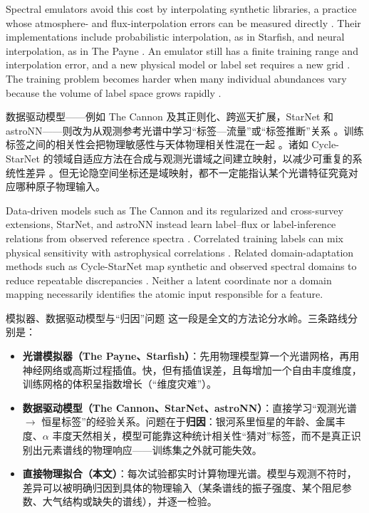 \begin{EN}
Spectral emulators avoid this cost by interpolating synthetic libraries, a
practice whose atmosphere- and flux-interpolation errors can be measured
directly \citep{MeszarosAllendePrieto2013}. Their
implementations include probabilistic interpolation, as in Starfish, and
neural interpolation, as in The Payne \citep{Czekala2015,Ting2019}. An emulator still
has a finite training range and interpolation error, and a new physical model
or label set requires a new grid \citep{Rozanski2025a}. The training problem
becomes harder when many individual abundances vary because the volume of label
space grows rapidly \citep{Casey2016,Ting2016}.
\end{EN}

数据驱动模型——例如 The Cannon 及其正则化、跨巡天扩展，StarNet 和 astroNN——则改为从观测参考光谱中学习“标签—流量”或“标签推断”关系 \citep{Ness2015,Casey2016,Ho2017,Fabbro2018,LeungBovy2019}。训练标签之间的相关性会把物理敏感性与天体物理相关性混在一起 \citep{Ting2017LAMOST,Xiang2019}。诸如 Cycle-StarNet 的领域自适应方法在合成与观测光谱域之间建立映射，以减少可重复的系统性差异 \citep{OBriain2021}。但无论隐空间坐标还是域映射，都不一定能指认某个光谱特征究竟对应哪种原子物理输入。

\begin{EN}
Data-driven models such as The Cannon and
its regularized and cross-survey extensions, StarNet, and astroNN instead learn
label--flux or label-inference relations
from observed reference spectra
\citep{Ness2015,Casey2016,Ho2017,Fabbro2018,LeungBovy2019}.
Correlated training labels can mix physical sensitivity with astrophysical
correlations \citep{Ting2017LAMOST,Xiang2019}. Related domain-adaptation
methods such as Cycle-StarNet map synthetic and observed spectral domains to
reduce repeatable discrepancies \citep{OBriain2021}. Neither a latent
coordinate nor a domain mapping necessarily identifies the atomic input
responsible for a feature.
\end{EN}

\begin{physbox}{模拟器、数据驱动模型与“归因”问题}
这一段是全文的方法论分水岭。三条路线分别是：
\begin{itemize}
\item \textbf{光谱模拟器（The Payne、Starfish）}：先用物理模型算一个光谱网格，再用神经网络或高斯过程插值。快，但有插值误差，且每增加一个自由丰度维度，训练网格的体积呈指数增长（“维度灾难”）。
\item \textbf{数据驱动模型（The Cannon、StarNet、astroNN）}：直接学习“观测光谱 $\rightarrow$ 恒星标签”的经验关系。问题在于\textbf{归因}：银河系里恒星的年龄、金属丰度、$\alpha$ 丰度天然相关，模型可能靠这种统计相关性“猜对”标签，而不是真正识别出元素谱线的物理响应——训练集之外就可能失效。
\item \textbf{直接物理拟合（本文）}：每次试验都实时计算物理光谱。模型与观测不符时，差异可以被明确归因到具体的物理输入（某条谱线的振子强度、某个阻尼参数、大气结构或缺失的谱线），并逐一检验。
\end{itemize}
\end{physbox}


